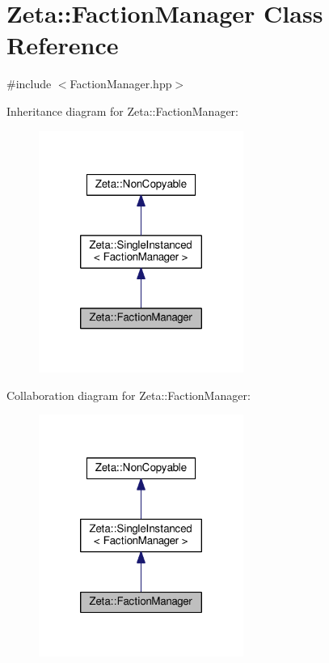 \hypertarget{classZeta_1_1FactionManager}{\section{Zeta\+:\+:Faction\+Manager Class Reference}
\label{classZeta_1_1FactionManager}
}


{\ttfamily \#include $<$Faction\+Manager.\+hpp$>$}



Inheritance diagram for Zeta\+:\+:Faction\+Manager\+:\nopagebreak
\begin{figure}[H]
\begin{center}
\leavevmode
\includegraphics[width=190pt]{classZeta_1_1FactionManager__inherit__graph}
\end{center}
\end{figure}


Collaboration diagram for Zeta\+:\+:Faction\+Manager\+:\nopagebreak
\begin{figure}[H]
\begin{center}
\leavevmode
\includegraphics[width=190pt]{classZeta_1_1FactionManager__coll__graph}
\end{center}
\end{figure}
